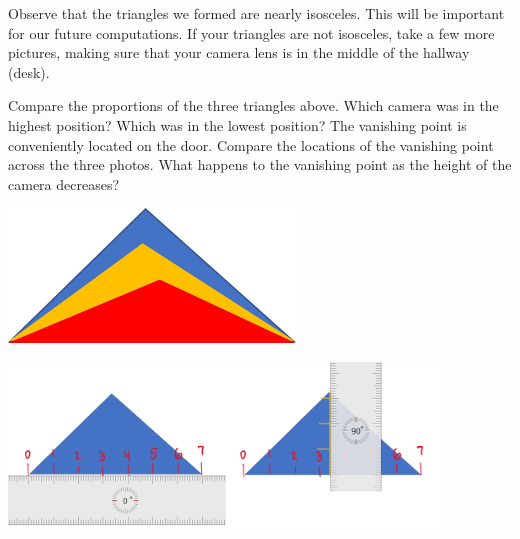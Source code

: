 \documentclass{ximera}
\begin{document}
\begin{exploration}
Observe that the triangles we formed are nearly isosceles.  This will be important for our future computations.  If your triangles are not isosceles, take a few more pictures, making sure that your camera lens is in the middle of the hallway (desk).

\begin{question}
    Compare the proportions of the three triangles above. Which camera was in the highest position?  Which was in the lowest position?  The vanishing point is conveniently located on the door.  Compare the locations of the vanishing point across the three photos.  What happens to the vanishing point as the height of the camera decreases?

    \begin{multipleChoice}
    \end{multipleChoice}
\end{question}


\begin{image}
         \includegraphics[width=3in]{threeTriangles.jpg}
\end{image}

\begin{image}
         \includegraphics[width=4.5in]{triangleMeasures.jpg}
\end{image}



\end{exploration}
\end{document}
